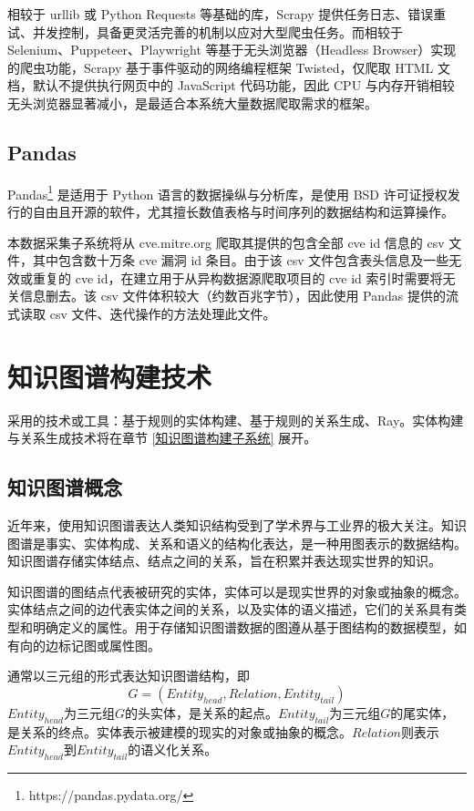 \documentclass[a4paper,AutoFakeBold,oneside,12pt]{book}
\begin{document}
相较于 urllib 或 Python Requests 等基础的库，Scrapy 提供任务日志、错误重试、并发控制，具备更灵活完善的机制以应对大型爬虫任务。而相较于 Selenium、Puppeteer、Playwright 等基于无头浏览器（Headless Browser）实现的爬虫功能，Scrapy 基于事件驱动的网络编程框架 Twisted，仅爬取 HTML 文档，默认不提供执行网页中的 JavaScript 代码功能，因此 CPU 与内存开销相较无头浏览器显著减小，是最适合本系统大量数据爬取需求的框架。

\subsection{Pandas}

Pandas\footnote{https://pandas.pydata.org/} 是适用于 Python 语言的数据操纵与分析库，是使用 BSD 许可证授权发行的自由且开源的软件，尤其擅长数值表格与时间序列的数据结构和运算操作。

本数据采集子系统将从 cve.mitre.org 爬取其提供的包含全部 cve id 信息的 csv 文件，其中包含数十万条 cve 漏洞 id 条目。由于该 csv 文件包含表头信息及一些无效或重复的 cve id，在建立用于从异构数据源爬取项目的 cve id 索引时需要将无关信息删去。该 csv 文件体积较大（约数百兆字节），因此使用 Pandas 提供的流式读取 csv 文件、迭代操作的方法处理此文件。

\section{知识图谱构建技术}

采用的技术或工具：基于规则的实体构建、基于规则的关系生成、Ray。实体构建与关系生成技术将在章节 \ref{知识图谱构建子系统} 展开。

\subsection{知识图谱概念}

近年来，使用知识图谱表达人类知识结构受到了学术界与工业界的极大关注。知识图谱是事实、实体构成、关系和语义的结构化表达，是一种用图表示的数据结构。知识图谱存储实体结点、结点之间的关系，旨在积累并表达现实世界的知识。\cite{ji_survey_2022}

知识图谱的图结点代表被研究的实体，实体可以是现实世界的对象或抽象的概念。实体结点之间的边代表实体之间的关系，以及实体的语义描述，它们的关系具有类型和明确定义的属性。\cite{ji_survey_2022}用于存储知识图谱数据的图遵从基于图结构的数据模型，如有向的边标记图或属性图。\cite{hogan_knowledge_2022}

通常以三元组的形式表达知识图谱结构，即
$$G=(Entity_{head}, Relation, Entity_{tail})$$
$Entity_{head}$为三元组$G$的头实体，是关系的起点。$Entity_{tail}$为三元组$G$的尾实体，是关系的终点。实体表示被建模的现实的对象或抽象的概念。$Relation$则表示$Entity_{head}$到$Entity_{tail}$的语义化关系。\cite{hogan_knowledge_2022}
\end{document}
